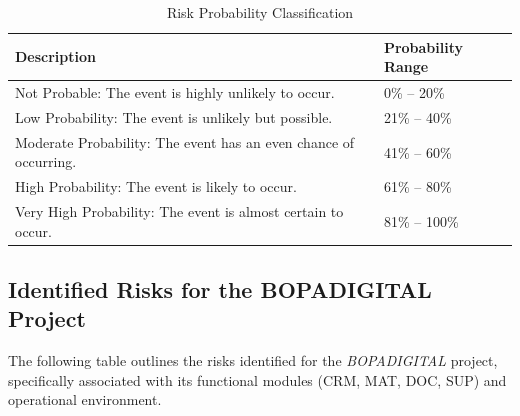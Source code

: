 \documentclass[letterpaper%
, oneside%
, 12pt%
, memoireprojet%
, english%
,creativecommons,hyperref, withAlgo2e %
]{thETS}
\begin{document}
\begin{table}[H]
\centering
\begin{tabular}{|p{8.5cm}|p{3.5cm}|}
\hline
\textbf{Description} & \textbf{Probability Range} \\ \hline

Not Probable: The event is highly unlikely to occur. & 0\% -- 20\% \\ \hline

Low Probability: The event is unlikely but possible. & 21\% -- 40\% \\ \hline

Moderate Probability: The event has an even chance of occurring. & 41\% -- 60\% \\ \hline

High Probability: The event is likely to occur. & 61\% -- 80\% \\ \hline

Very High Probability: The event is almost certain to occur. & 81\% -- 100\% \\ \hline

\end{tabular}
\caption{Risk Probability Classification}
\end{table}

\subsection{Identified Risks for the BOPADIGITAL Project}

The following table outlines the risks identified for the \textit{BOPADIGITAL} project, specifically associated with its functional modules (CRM, MAT, DOC, SUP) and operational environment.

\begingroup
\setlength{\LTleft}{-4cm plus -1fill}
\setlength{\LTright}{\LTleft}
\end{document}
